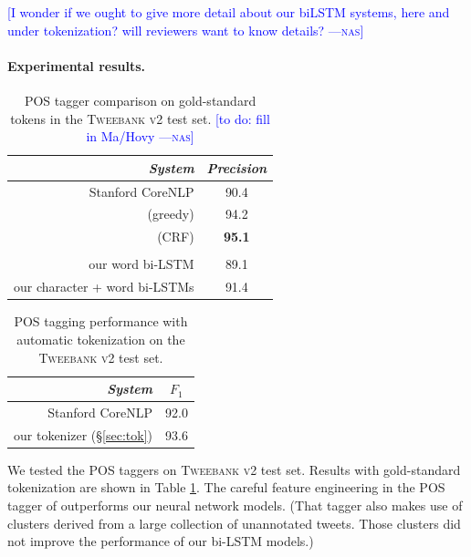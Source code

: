 \documentclass[11pt,a4paper]{article}
\newcommand{\nascomment}[1]{\textcolor{blue}{[#1 ---\textsc{nas}]}}
\begin{document}
\nascomment{I wonder if we ought to give more detail about our biLSTM
  systems, here and under tokenization?  will reviewers want to know details?}

\paragraph{Experimental results.}

\begin{table}[t]
	\centering
	\begin{tabular}{rc}
		\hline
		\it System & \it Precision \\
		\hline
		Stanford CoreNLP & 90.4 \\
		\citealp{owoputi-EtAl:2013:NAACL-HLT} (greedy) & 94.2 \\
		\citealp{owoputi-EtAl:2013:NAACL-HLT} (CRF) & \bf 95.1 \\
		\hdashline
		\citealp{ma-hovy:2016:P16-1} & \\
		our word bi-LSTM & 89.1 \\
		our character + word bi-LSTMs & 91.4 \\
		\hline
	\end{tabular}
	\caption{POS tagger comparison on gold-standard tokens in the
          \textsc{Tweebank v2} test set. \label{tbl:pos-result}
          \nascomment{to do:  fill in Ma/Hovy}}
\end{table}

\begin{table}[t]
	\centering
	\begin{tabular}{rc}
		\hline
		\it System & $F_1$ \\
		\hline
		Stanford CoreNLP & 92.0 \\
		our tokenizer (\S\ref{sec:tok}) & 93.6 \\
		\hline
	\end{tabular}
	\caption{\citet{owoputi-EtAl:2013:NAACL-HLT} POS tagging performance with automatic tokenization on
          the \textsc{Tweebank v2} test set. \label{tbl:pos-result-vs-tok}}
\end{table}

We tested the POS taggers on \textsc{Tweebank v2} test set.  Results
with gold-standard tokenization are shown in
Table \ref{tbl:pos-result}. The careful feature engineering in the 
POS tagger  of \citet{owoputi-EtAl:2013:NAACL-HLT} outperforms our neural network
models.  (That tagger also makes use of \citet{Brown} clusters derived
from a large collection of unannotated tweets.  Those clusters did not
improve the performance of our bi-LSTM models.)
\end{document}
